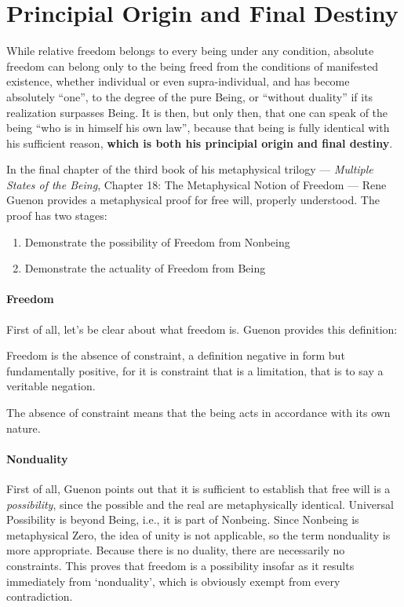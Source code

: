 \section{Principial Origin and Final Destiny}

\begin{quotex}
While relative freedom belongs to every being under any condition, absolute freedom can belong only to the being freed from the conditions of manifested existence, whether individual or even supra-individual, and has become absolutely “one”, to the degree of the pure Being, or “without duality” if its realization surpasses Being. It is then, but only then, that one can speak of the being “who is in himself his own law”, because that being is fully identical with his sufficient reason, \textbf{which is both his principial origin and final destiny}. 

\end{quotex}
In the final chapter of the third book of his metaphysical trilogy — \emph{Multiple States of the Being}, Chapter 18: The Metaphysical Notion of Freedom — Rene Guenon provides a metaphysical proof for free will, properly understood. The proof has two stages:

\begin{enumerate}[nosep]
\item Demonstrate the possibility of Freedom from Nonbeing 
\item Demonstrate the actuality of Freedom from Being 
\end{enumerate}

\paragraph{Freedom}
First of all, let's be clear about what freedom is. Guenon provides this definition:

\begin{quotex}
Freedom is the absence of constraint, a definition negative in form but fundamentally positive, for it is constraint that is a limitation, that is to say a veritable negation.

\end{quotex}
The absence of constraint means that the being acts in accordance with its own nature.

\paragraph{Nonduality}
First of all, Guenon points out that it is sufficient to establish that free will is a \emph{possibility}, since the possible and the real are metaphysically identical. Universal Possibility is beyond Being, i.e., it is part of Nonbeing. Since Nonbeing is metaphysical Zero, the idea of unity is not applicable, so the term nonduality is more appropriate. Because there is no duality, there are necessarily no constraints. This proves that freedom is a possibility insofar as it results immediately from `nonduality’, which is obviously exempt from every contradiction.

